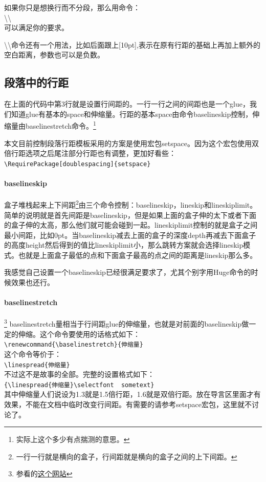 \documentclass[11pt,oneside]{book}
\begin{document}
\begin{common-format}
如果你只是想换行而不分段，那么用命令：\\
\textbackslash \textbackslash \\
可以满足你的要求。

\textbackslash \textbackslash 命令还有一个用法，比如后面跟上[10pt],表示在原有行距的基础上再加上额外的空白距离，参数也可以是负数。

\subsection[段落中的行距]{段落中的行距}
在上面的代码中第3行就是设置行间距的。一行一行之间的间距也是一个glue，我们知道glue有基本的space和伸缩量。行距的基本space由命令baselineskip控制，伸缩量由baselinestretch命令。\footnote{实际上这个多少有点揣测的意思。}

本文目前控制段落行距模板采用的方案是使用宏包setspace。因为这个宏包使用双倍行距选项之后尾注部分行距也有调整，更加好看些：\\
\verb+\RequirePackage[doublespacing]{setspace}+

\paragraph{baselineskip} 
盒子堆栈起来上下间距\footnote{一行一行就是横向的盒子，行间距就是横向的盒子之间的上下间距。}由三个命令控制：baselineskip，lineskip和lineskiplimit。简单的说明就是首先间距是baselineskip，但是如果上面的盒子伸的太下或者下面的盒子伸的太高，那么他们就可能会碰到一起。lineskiplimit控制的就是盒子之间最小间距，比如0pt。当baselineskip减去上面的盒子的深度depth再减去下面盒子的高度height然后得到的值比lineskiplimit小，那么跳转方案就会选择lineskip模式。也就是上面盒子最低的点和下面盒子最高的点之间的距离是lineskip那么多。

我感觉自己设置一个baselineskip已经很满足要求了，尤其个别字用Huge命令的时候效果也还行。

\paragraph{baselinestretch}\footnote{参看的\href{http://www.tex.ac.uk/cgi-bin/texfaq2html?label=linespread}{这个网站}}
baselinestretch量相当于行间距glue的伸缩量，也就是对前面的baselineskip做一定的伸缩。这个命令要使用的话格式如下：\\
\verb+\renewcommand{\baselinestretch}{伸缩量}+\\
这个命令等价于：\\
\verb+\linespread{伸缩量}+\\
不过这不是故事的全部。完整的设置格式如下：\\
\verb+{\linespread{伸缩量}\selectfont  sometext}+\\
其中伸缩量人们说设为1.3就是1.5倍行距，1.6就是双倍行距。放在导言区里面才有效果，不能在文档中临时改变行间距。有需要的请参考setspace宏包，这里就不讨论了。



\end{common-format}
\end{document}
